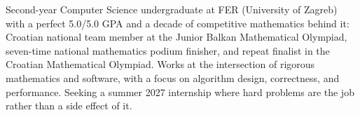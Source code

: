 %

\begin{cvparagraph}

Second-year Computer Science undergraduate at FER (University of Zagreb) with a perfect
5.0/5.0 GPA and a decade of competitive mathematics behind it: Croatian national team member
at the Junior Balkan Mathematical Olympiad, seven-time national mathematics podium finisher,
and repeat finalist in the Croatian Mathematical Olympiad.
Works at the intersection of rigorous mathematics and software, with a focus on algorithm
design, correctness, and performance. Seeking a summer 2027 internship where hard problems
are the job rather than a side effect of it.

\end{cvparagraph}
